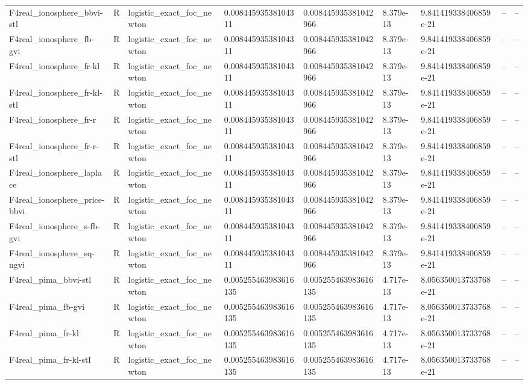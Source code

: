 \begin{tabular}{lllllllll}
F4real\_ionosphere\_bbvi-stl & R & logistic\_exact\_foc\_newton & 0.00844593538104311 & 0.008445935381042966 & 8.379e-13 & 9.841419338406859e-21 & -- & -- \\
F4real\_ionosphere\_fb-gvi & R & logistic\_exact\_foc\_newton & 0.00844593538104311 & 0.008445935381042966 & 8.379e-13 & 9.841419338406859e-21 & -- & -- \\
F4real\_ionosphere\_fr-kl & R & logistic\_exact\_foc\_newton & 0.00844593538104311 & 0.008445935381042966 & 8.379e-13 & 9.841419338406859e-21 & -- & -- \\
F4real\_ionosphere\_fr-kl-stl & R & logistic\_exact\_foc\_newton & 0.00844593538104311 & 0.008445935381042966 & 8.379e-13 & 9.841419338406859e-21 & -- & -- \\
F4real\_ionosphere\_fr-r & R & logistic\_exact\_foc\_newton & 0.00844593538104311 & 0.008445935381042966 & 8.379e-13 & 9.841419338406859e-21 & -- & -- \\
F4real\_ionosphere\_fr-r-stl & R & logistic\_exact\_foc\_newton & 0.00844593538104311 & 0.008445935381042966 & 8.379e-13 & 9.841419338406859e-21 & -- & -- \\
F4real\_ionosphere\_laplace & R & logistic\_exact\_foc\_newton & 0.00844593538104311 & 0.008445935381042966 & 8.379e-13 & 9.841419338406859e-21 & -- & -- \\
F4real\_ionosphere\_price-bbvi & R & logistic\_exact\_foc\_newton & 0.00844593538104311 & 0.008445935381042966 & 8.379e-13 & 9.841419338406859e-21 & -- & -- \\
F4real\_ionosphere\_s-fb-gvi & R & logistic\_exact\_foc\_newton & 0.00844593538104311 & 0.008445935381042966 & 8.379e-13 & 9.841419338406859e-21 & -- & -- \\
F4real\_ionosphere\_sq-ngvi & R & logistic\_exact\_foc\_newton & 0.00844593538104311 & 0.008445935381042966 & 8.379e-13 & 9.841419338406859e-21 & -- & -- \\
F4real\_pima\_bbvi-stl & R & logistic\_exact\_foc\_newton & 0.005255463983616135 & 0.005255463983616135 & 4.717e-13 & 8.056350013733768e-21 & -- & -- \\
F4real\_pima\_fb-gvi & R & logistic\_exact\_foc\_newton & 0.005255463983616135 & 0.005255463983616135 & 4.717e-13 & 8.056350013733768e-21 & -- & -- \\
F4real\_pima\_fr-kl & R & logistic\_exact\_foc\_newton & 0.005255463983616135 & 0.005255463983616135 & 4.717e-13 & 8.056350013733768e-21 & -- & -- \\
F4real\_pima\_fr-kl-stl & R & logistic\_exact\_foc\_newton & 0.005255463983616135 & 0.005255463983616135 & 4.717e-13 & 8.056350013733768e-21 & -- & -- \\

\end{tabular}
